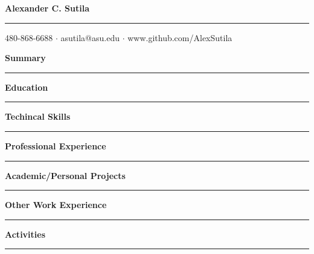 \documentclass{article}
\begin{document}
\begin{center}
    \LARGE{\textbf{Alexander C. Sutila}}
\end{center}
\noindent\rule{\textwidth}{0.4pt}

\begin{center}
    480-868-6688 $\cdot$ asutila@asu.edu $\cdot$ www.github.com/AlexSutila
\end{center}


\noindent\large{\textbf{Summary}}\\[-0.6em]
\noindent\rule{\textwidth}{0.4pt}
\begin{normalsize}
    
\end{normalsize}
\vspace{1em}


\noindent\large{\textbf{Education}}\\[-0.6em]
\noindent\rule{\textwidth}{0.4pt}
\begin{normalsize}
    
\end{normalsize}
\vspace{1em}


\noindent\large{\textbf{Techincal Skills}}\\[-0.6em]
\noindent\rule{\textwidth}{0.4pt}
\begin{normalsize}
    
\end{normalsize}
\vspace{1em}


\noindent\large{\textbf{Professional Experience}}\\[-0.6em]
\noindent\rule{\textwidth}{0.4pt}
\begin{normalsize}
    
\end{normalsize}
\vspace{1em}


\noindent\large{\textbf{Academic/Personal Projects}}\\[-0.6em]
\noindent\rule{\textwidth}{0.4pt}
\begin{normalsize}
    
\end{normalsize}
\vspace{1em}


\noindent\large{\textbf{Other Work Experience}}\\[-0.6em]
\noindent\rule{\textwidth}{0.4pt}
\begin{normalsize}
    
\end{normalsize}
\vspace{1em}


\noindent\large{\textbf{Activities}}\\[-0.6em]
\noindent\rule{\textwidth}{0.4pt}
\begin{normalsize}
    
\end{normalsize}
\vspace{1em}
\end{document}
